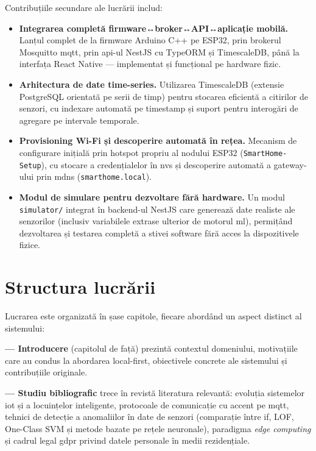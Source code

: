 Contribuțiile secundare ale lucrării includ:
\begin{itemize}
  \item \textbf{Integrarea completă firmware↔broker↔API↔aplicație mobilă.}
  Lanțul complet de la firmware Arduino C++ pe ESP32, prin brokerul Mosquitto
  \gls{mqtt}, prin \gls{api}-ul NestJS cu TypeORM și TimescaleDB, până la
  interfața React Native — implementat și funcțional pe hardware fizic.

  \item \textbf{Arhitectura de date time-series.}
  Utilizarea TimescaleDB (extensie PostgreSQL orientată pe serii de timp) pentru
  stocarea eficientă a citirilor de senzori, cu indexare automată pe timestamp
  și suport pentru interogări de agregare pe intervale temporale.

  \item \textbf{Provisioning Wi-Fi și descoperire automată în rețea.}
  Mecanism de configurare inițială prin hotspot propriu al nodului ESP32
  (\texttt{SmartHome-Setup}), cu stocare a credențialelor în \gls{nvs} și
  descoperire automată a gateway-ului prin \gls{mdns} (\texttt{smarthome.local}).

  \item \textbf{Modul de simulare pentru dezvoltare fără hardware.}
  Un modul \texttt{simulator/} integrat în backend-ul NestJS care generează date
  realiste ale senzorilor (inclusiv variabilele extrase ulterior de motorul \gls{ml}),
  permițând dezvoltarea și testarea completă a stivei software fără acces la
  dispozitivele fizice.
\end{itemize}

\section{Structura lucrării}
\label{sec:structura}

Lucrarea este organizată în șase capitole, fiecare abordând un aspect distinct
al sistemului:

\textbf{ — Introducere} (capitolul de față) prezintă
contextul domeniului, motivațiile care au condus la abordarea local-first,
obiectivele concrete ale sistemului și contribuțiile originale.

\textbf{ — Studiu bibliografic} trece în revistă literatura
relevantă: evoluția sistemelor \gls{iot} și a locuințelor inteligente, protocoale
de comunicație cu accent pe \gls{mqtt}, tehnici de detecție a anomaliilor în date
de senzori (comparație între \gls{if}, LOF, One-Class SVM și metode bazate pe
rețele neuronale), paradigma \emph{edge computing} și cadrul legal \gls{gdpr}
privind datele personale în medii rezidențiale.

